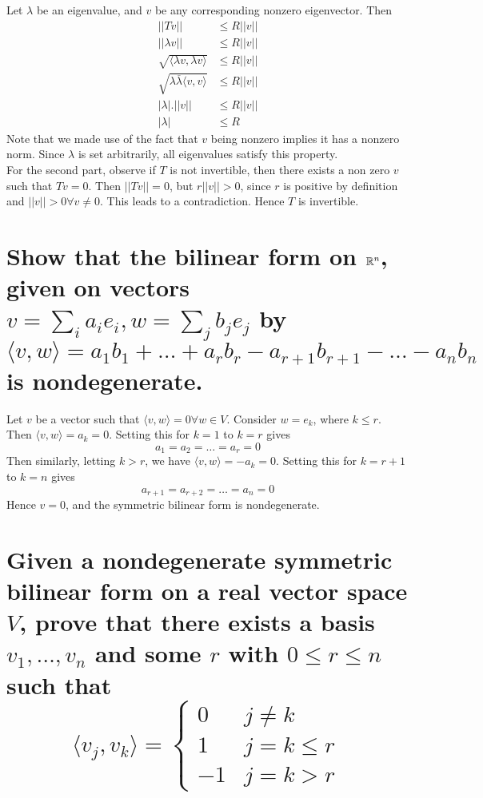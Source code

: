 \documentclass[answers]{exam}
\begin{document}
\begin{questions}
\begin{solution}
	Let $\lambda$ be an eigenvalue, and $v$ be any corresponding nonzero eigenvector. Then
	\begin{align*}
		||Tv|| &\leq R||v|| \\
		||\lambda v|| &\leq R||v|| \\
		\sqrt{\langle \lambda v,\lambda v \rangle} &\leq R||v|| \\
		\sqrt{\lambda\overline{\lambda}\langle v,v \rangle} &\leq R||v|| \\
		|\lambda|.||v|| &\leq R||v|| \\
		|\lambda| &\leq R
	\end{align*}
	Note that we made use of the fact that $v$ being nonzero implies it has a nonzero norm. Since $\lambda$ is set arbitrarily, all eigenvalues satisfy this property. \\
	For the second part, observe if $T$ is not invertible, then there exists a non zero $v$ such that $Tv = 0$. Then $||Tv||=0$, but $r||v||>0$, since $r$ is positive by definition and $||v||>0\forall v\neq 0$. This leads to a contradiction. Hence $T$ is invertible.
\end{solution}


\begin{parts}
	\part{Show that the bilinear form on $\mathbb{R}^n$, given on vectors $v = \sum_i a_ie_i, w = \sum_jb_je_j$ by
		$$\langle v,w \rangle = a_1b_1 + \dots + a_rb_r - a_{r+1}b_{r+1} - \dots - a_nb_n$$
	is nondegenerate.}
	
	\begin{solution}
		Let $v$ be a vector such that $\langle v,w \rangle = 0 \forall w \in V$. Consider $w = e_k$, where $k\leq r$. Then $\langle v,w \rangle = a_k = 0$. Setting this for $k=1$ to $k=r$ gives
		$$a_1=a_2=\dots=a_r=0$$
		Then similarly, letting $k>r$, we have $\langle v,w \rangle = -a_k = 0$. Setting this for $k=r+1$ to $k=n$ gives
		$$a_{r+1}=a_{r+2}=\dots=a_n=0$$
		Hence $v=0$, and the symmetric bilinear form is nondegenerate.
	\end{solution}

	\part{Given a nondegenerate symmetric bilinear form on a real vector space $V$, prove that there exists a basis $v_1,\dots,v_n$ and some $r$ with $0\leq r\leq n$ such that
		$$\langle v_j,v_k \rangle = \begin{cases} 0 & j \neq k \\ 1 & j=k\leq r \\ -1 & j=k>r \end{cases}$$
	}


\end{parts}
\end{questions}
\end{document}
